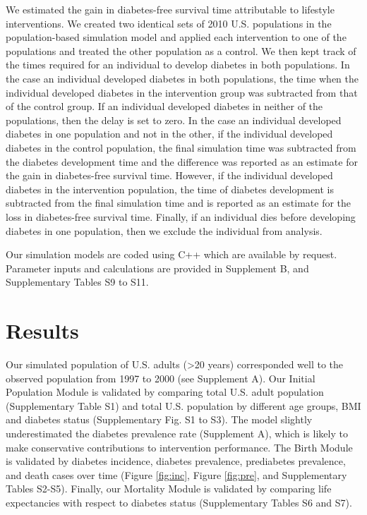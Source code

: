 \documentclass[fleqn,10pt]{wlscirep}
\begin{document}
We estimated the gain in diabetes-free survival time attributable to lifestyle interventions. We created two identical sets of 2010 U.S. populations in the population-based simulation model and applied each intervention to one of the populations and treated the other population as a control. We then kept track of the times required for an individual to develop diabetes in both populations. In the case an individual developed diabetes in both populations, the time when the individual developed diabetes in the intervention group was subtracted from that of the control group. If an individual developed diabetes in neither of the populations, then the delay is set to zero. In the case an individual developed diabetes in one population and not in the other, if the individual developed diabetes in the control population, the final simulation time was subtracted from the diabetes development time and the difference was reported as an estimate for the gain in diabetes-free survival time. However, if the individual developed diabetes in the intervention population, the time of diabetes development is subtracted from the final simulation time and is reported as an estimate for the loss in diabetes-free survival time. Finally, if an individual dies before developing diabetes in one population, then we exclude the individual from analysis.

Our simulation models are coded using C++ which are available by request. Parameter inputs and calculations are provided in Supplement B, and Supplementary Tables S9 to S11.

\section*{Results}
Our simulated population of U.S. adults (>20 years) corresponded well to the observed population from 1997 to 2000 (see Supplement A). Our Initial Population Module is validated by comparing total U.S. adult population (Supplementary Table S1) and total U.S. population by different age groups, BMI and diabetes status (Supplementary Fig. S1 to S3). The model slightly underestimated the diabetes prevalence rate (Supplement A), which is likely to make conservative contributions to intervention performance. The Birth Module is validated by diabetes incidence, diabetes prevalence, prediabetes prevalence, and death cases over time \cite{murphy:deaths:2013} (Figure \ref{fig:inc}, Figure \ref{fig:pre}, and Supplementary Tables S2-S5). Finally, our Mortality Module is validated by comparing life expectancies with respect to diabetes status (Supplementary Tables S6 and S7).
\end{document}
